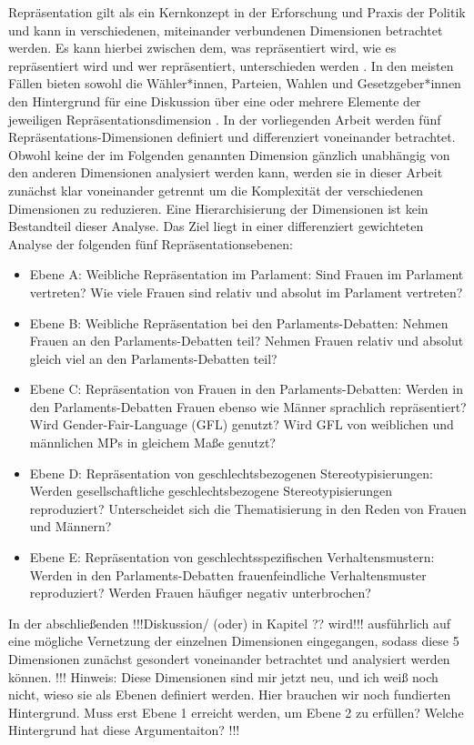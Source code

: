 \documentclass[12pt, 
    twoside=false, 
    bibliography=totoc, 
    numbers=endperiod, 
    headings=normal, 
    toc=chapterentrydotfill
    ]{scrbook}
\begin{document}
Repräsentation gilt als ein Kernkonzept in der Erforschung und Praxis der Politik und kann in verschiedenen, miteinander verbundenen Dimensionen betrachtet werden. Es kann hierbei zwischen dem, was repräsentiert wird, wie es repräsentiert wird und wer repräsentiert, unterschieden werden \parencite[557]{galligan_2007}. In den meisten Fällen bieten sowohl die Wähler*innen, Parteien, Wahlen und Gesetzgeber*innen den Hintergrund für eine Diskussion über eine oder mehrere Elemente der jeweiligen Repräsentationsdimension \parencite[557]{galligan_2007}.
In der vorliegenden Arbeit werden fünf Repräsentations-Dimensionen definiert und differenziert voneinander betrachtet. Obwohl keine der im Folgenden genannten Dimension gänzlich unabhängig von den anderen Dimensionen analysiert werden kann, werden sie in dieser Arbeit zunächst klar voneinander getrennt um die Komplexität der verschiedenen Dimensionen zu reduzieren. Eine Hierarchisierung der Dimensionen ist kein Bestandteil dieser Analyse. Das Ziel liegt in einer differenziert gewichteten Analyse der folgenden fünf Repräsentationsebenen:

\begin{itemize}
    \item Ebene A: Weibliche Repräsentation im Parlament: Sind Frauen im Parlament vertreten? Wie viele Frauen sind relativ und absolut im Parlament vertreten? 
    \item Ebene B: Weibliche Repräsentation bei den Parlaments-Debatten: Nehmen Frauen an den Parlaments-Debatten teil? Nehmen Frauen relativ und absolut gleich viel an den Parlaments-Debatten teil? 
    \item Ebene C: Repräsentation von Frauen in den Parlaments-Debatten: Werden in den Parlaments-Debatten Frauen ebenso wie Männer sprachlich repräsentiert? Wird Gender-Fair-Language (GFL) genutzt? Wird GFL von weiblichen und männlichen MPs in gleichem Maße genutzt? 
    \item Ebene D: Repräsentation von geschlechtsbezogenen Stereotypisierungen: Werden gesellschaftliche geschlechtsbezogene Stereotypisierungen reproduziert? Unterscheidet sich die Thematisierung in den Reden von Frauen und Männern? 
    \item Ebene E: Repräsentation von geschlechtsspezifischen Verhaltensmustern: Werden in den Parlaments-Debatten frauenfeindliche Verhaltensmuster reproduziert? Werden Frauen häufiger negativ unterbrochen?  
\end{itemize}

In der abschließenden !!!Diskussion/ (oder) in Kapitel ?? wird!!! ausführlich auf eine mögliche Vernetzung der einzelnen Dimensionen eingegangen, sodass diese 5 Dimensionen zunächst gesondert voneinander betrachtet und analysiert werden können.  !!! Hinweis: Diese Dimensionen sind mir jetzt neu, und ich weiß noch nicht, wieso sie als Ebenen definiert werden. Hier brauchen wir noch fundierten Hintergrund. Muss erst Ebene 1 erreicht werden, um Ebene 2 zu erfüllen? Welche Hintergrund hat diese Argumentaiton? !!!
\end{document}
